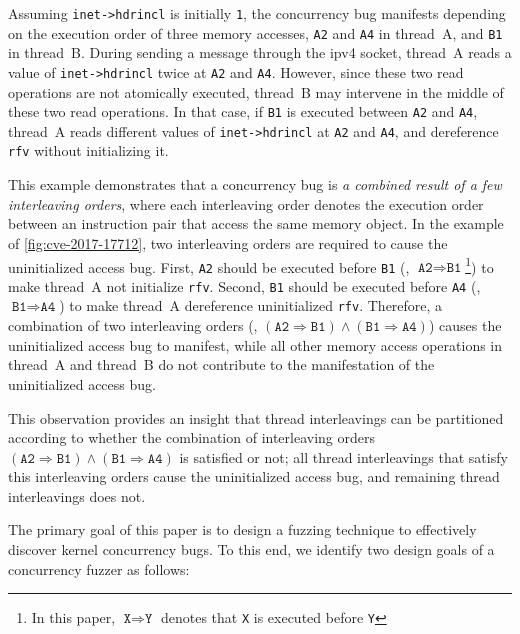 Assuming \texttt{inet->hdrincl} is initially \texttt{1}, the
concurrency bug manifests depending on the execution order of three
memory accesses, \texttt{A2} and \texttt{A4} in thread~A, and
\texttt{B1} in thread~B.
%
During sending a message through the ipv4 socket, thread~A reads a
value of \texttt{inet->hdrincl} twice at \texttt{A2} and \texttt{A4}.
%
However, since these two read operations are not atomically executed,
thread~B may intervene in the middle of these two read operations.
%
In that case, if \texttt{B1} is executed between \texttt{A2} and
\texttt{A4}, thread~A reads different values of \texttt{inet->hdrincl}
at \texttt{A2} and \texttt{A4}, and dereference \texttt{rfv} without
initializing it.


%
This example demonstrates that a concurrency bug is \textit{a combined
  result of a few interleaving orders}, where each interleaving order
denotes the execution order between an instruction pair that access
the same memory object.
%
In the example of \autoref{fig:cve-2017-17712}, two interleaving orders
are required to cause the uninitialized access bug.
%
First, \texttt{A2} should be executed before \texttt{B1} (\ie,
$\texttt{A2} \Rightarrow \texttt{B1}$\footnote{In this paper,
  $\texttt{X} \Rightarrow \texttt{Y}$ denotes that \texttt{X} is
  executed before \texttt{Y}}) to make thread~A not initialize
\texttt{rfv}.
%
Second, \texttt{B1} should be executed before \texttt{A4} (\ie,
$\texttt{B1} \Rightarrow \texttt{A4}$) to make thread~A dereference
uninitialized \texttt{rfv}.
%
Therefore, a combination of two interleaving orders (\ie,
$(\texttt{A2} \Rightarrow \texttt{B1}) \wedge (\texttt{B1} \Rightarrow
\texttt{A4})$) causes the uninitialized access bug to manifest, while
all other memory access operations in thread~A and thread~B do not
contribute to the manifestation of the uninitialized access bug.



This observation provides an insight that thread interleavings can be
partitioned according to whether the combination of interleaving
orders
$(\texttt{A2} \Rightarrow \texttt{B1}) \wedge (\texttt{B1} \Rightarrow
\texttt{A4})$ is satisfied or not; all thread interleavings that
satisfy this interleaving orders cause the uninitialized access bug,
and remaining thread interleavings does not.



%
The primary goal of this paper is to design a fuzzing technique to
effectively discover kernel concurrency bugs. To this end, we identify
two design goals of a concurrency fuzzer as follows:

